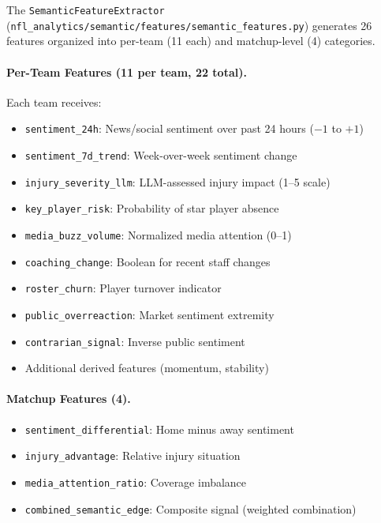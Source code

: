 The \texttt{SemanticFeatureExtractor} (\texttt{nfl\_analytics/semantic/\allowbreak features/\allowbreak semantic\_features.py}) generates 26 features organized into per-team (11 each) and matchup-level (4) categories.

\paragraph{Per-Team Features (11 per team, 22 total).}
Each team receives:

\begin{itemize}[itemsep=2pt,parsep=0pt]
    \item \texttt{sentiment\_24h}: News/social sentiment over past 24 hours ($-1$ to $+1$)
    \item \texttt{sentiment\_7d\_trend}: Week-over-week sentiment change
    \item \texttt{injury\_severity\_llm}: LLM-assessed injury impact (1--5 scale)
    \item \texttt{key\_player\_risk}: Probability of star player absence
    \item \texttt{media\_buzz\_volume}: Normalized media attention (0--1)
    \item \texttt{coaching\_change}: Boolean for recent staff changes
    \item \texttt{roster\_churn}: Player turnover indicator
    \item \texttt{public\_overreaction}: Market sentiment extremity
    \item \texttt{contrarian\_signal}: Inverse public sentiment
    \item Additional derived features (momentum, stability)
\end{itemize}

\paragraph{Matchup Features (4).}

\begin{itemize}[itemsep=2pt,parsep=0pt]
    \item \texttt{sentiment\_differential}: Home minus away sentiment
    \item \texttt{injury\_advantage}: Relative injury situation
    \item \texttt{media\_attention\_ratio}: Coverage imbalance
    \item \texttt{combined\_semantic\_edge}: Composite signal (weighted combination)
\end{itemize}


